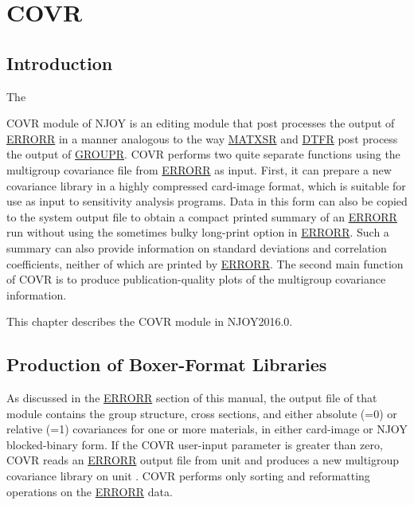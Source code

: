 \section{COVR}
\label{sCOVR}

\subsection{Introduction}
\label{ssCOVR_intro}

\hypertarget{sCOVRhy}{The}
COVR module of NJOY is an editing module that
post processes the output of
\hyperlink{sERRORRhy}{ERRORR} in a manner
analogous to the way
\hyperlink{sMATXSRhy}{MATXSR} and
\hyperlink{sDTFRhy}{DTFR}
post process the output of
\hyperlink{sGROUPRhy}{GROUPR}.  COVR performs
two quite separate functions using the multigroup covariance
file from
\hyperlink{sERRORRhy}{ERRORR} as input.  First, it can
prepare a new covariance library in a highly compressed
card-image format, which is suitable for use as input to sensitivity
analysis programs\cite{sensit,sensit-2}.
Data in this form can also be copied to the system output file
to obtain a compact printed summary of an
\hyperlink{sERRORRhy}{ERRORR} run without using
the sometimes bulky long-print option in
\hyperlink{sERRORRhy}{ERRORR}.  Such a summary
can also provide information on standard deviations and correlation
coefficients, neither of which are printed by
\hyperlink{sERRORRhy}{ERRORR}.  The second
main function of COVR is to produce publication-quality
plots\cite{LaBauve} of the multigroup covariance information.

This chapter describes the COVR module in NJOY2016.0.

\subsection{Production of Boxer-Format Libraries}
\label{ssCOVR_Boxer}

As discussed in the
\hyperlink{sERRORRhy}{ERRORR} section of this manual, the
output file of that module contains the group structure, cross
sections, and either absolute (=0) or relative
(=1) covariances for one or more materials, in either
card-image or NJOY blocked-binary form.  If the COVR user-input
parameter  is greater than zero, COVR reads an
\hyperlink{sERRORRhy}{ERRORR}
output file from unit  and produces a new multigroup
covariance library on unit .  COVR performs only sorting
and reformatting operations on the
\hyperlink{sERRORRhy}{ERRORR} data.

